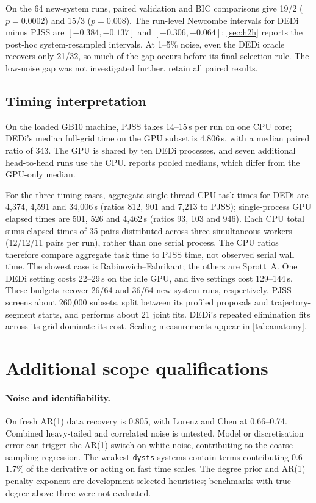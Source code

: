 On the 64 new-system runs, paired validation and BIC comparisons give 19/2 ($p=0.0002$) and 15/3 ($p=0.008$). The run-level Newcombe intervals for DEDi minus PJSS are $[-0.384,-0.137]$ and $[-0.306,-0.064]$; \cref{sec:h2h} reports the post-hoc system-resampled intervals. At 1--5\% noise, even the DEDi oracle recovers only 21/32, so much of the gap occurs before its final selection rule. The low-noise gap was not investigated further.  retain all paired results.

\subsection{Timing interpretation}\label{app:timing-detail}
On the loaded GB10 machine, PJSS takes 14--15\,s per run on one CPU core; DEDi's median full-grid time on the GPU subset is 4{,}806\,s, with a median paired ratio of 343. The GPU is shared by ten DEDi processes, and seven additional head-to-head runs use the CPU.  reports pooled medians, which differ from the GPU-only median.

For the three timing cases, aggregate single-thread CPU task times for DEDi are 4{,}374, 4{,}591 and 34{,}006\,s (ratios 812, 901 and 7{,}213 to PJSS); single-process GPU elapsed times are 501, 526 and 4{,}462\,s (ratios 93, 103 and 946). Each CPU total sums elapsed times of 35 pairs distributed across three simultaneous workers (12/12/11 pairs per run), rather than one serial process. The CPU ratios therefore compare aggregate task time to PJSS time, not observed serial wall time. The slowest case is Rabinovich--Fabrikant; the others are Sprott~A. One DEDi setting costs 22--29\,s on the idle GPU, and five settings cost 129--144\,s. These budgets recover 26/64 and 36/64 new-system runs, respectively. PJSS screens about 260{,}000 subsets, split between its profiled proposals and trajectory-segment starts, and performs about 21 joint fits. DEDi's repeated elimination fits across its grid dominate its cost. Scaling measurements appear in \cref{tab:anatomy}.

\section{Additional scope qualifications}
\label{app:limitations-detail}

\paragraph{Noise and identifiability.} On fresh AR(1) data recovery is 0.805, with Lorenz and Chen at 0.66--0.74. Combined heavy-tailed and correlated noise is untested. Model or discretisation error can trigger the AR(1) switch on white noise, contributing to the coarse-sampling regression. The weakest \texttt{dysts} systems contain terms contributing 0.6--1.7\% of the derivative or acting on fast time scales. The degree prior and AR(1) penalty exponent are development-selected heuristics; benchmarks with true degree above three were not evaluated.

